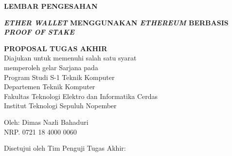 \begin{center}
	\large
  \textbf{LEMBAR PENGESAHAN}
\end{center}

\thispagestyle{empty}

\begin{center}
  \textbf{\emph{ETHER WALLET} MENGGUNAKAN \emph{ETHEREUM} BERBASIS \emph{PROOF OF STAKE}}
\end{center}

\begingroup
  \small
  
  \vspace{3ex}

  \begin{center}
    \textbf{PROPOSAL TUGAS AKHIR}
    \\Diajukan untuk memenuhi salah satu syarat
    \\memperoleh gelar Sarjana pada
    \\Program Studi S-1 Teknik Komputer
    \\Departemen Teknik Komputer
    \\Fakultas Teknologi Elektro dan Informatika Cerdas
    \\Institut Teknologi Sepuluh Nopember
  \end{center}

  \vspace{3ex}

  \begin{center}
    Oleh: Dimas Nazli Bahaduri 
    \\NRP. 0721 18 4000 0060
  \end{center}

  \vspace{3ex}


  \begin{center}
    Disetujui oleh Tim Penguji Tugas Akhir:
  \end{center}

  \vspace{4ex}

  \begingroup
    \setlength{\tabcolsep}{0pt}

